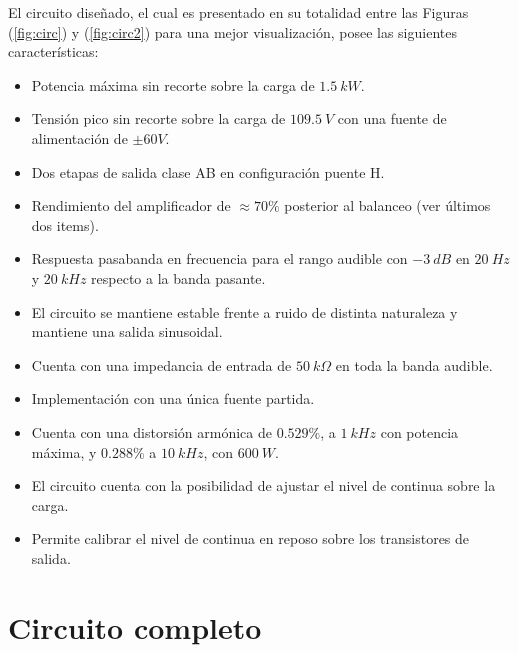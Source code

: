 
El circuito diseñado, el cual es presentado en su totalidad entre las Figuras (\ref{fig:circ}) y (\ref{fig:circ2}) para una mejor visualización, posee las siguientes características:
\begin{itemize}
\item Potencia máxima sin recorte sobre la carga de $1.5 \ kW$.
\item Tensión pico sin recorte sobre la carga de $109.5 \ V$ con una fuente de alimentación de $\pm 60V$.
\item Dos etapas de salida clase AB en configuración puente H.
\item Rendimiento del amplificador de $\approx 70\%$ posterior al balanceo (ver últimos dos items).
\item Respuesta pasabanda en frecuencia para el rango audible con $-3 \ dB$ en  $20 \ Hz$ y  $20 \ kHz$ respecto a la banda pasante.
\item El circuito se mantiene estable frente a ruido de distinta naturaleza y mantiene una salida sinusoidal.
\item Cuenta con una impedancia de entrada de $50 \ k\Omega$ en toda la banda audible.
\item Implementación con una única fuente partida.
\item Cuenta con una distorsión armónica de $0.529 \%$, a $1 \ kHz$ con potencia máxima, y $0.288\%$ a $10 \ kHz$, con $600 \ W$.
\item El circuito cuenta con la posibilidad de ajustar el nivel de continua sobre la carga.
\item Permite calibrar el nivel de continua en reposo sobre los transistores de salida.
\end{itemize}

\newpage

\section{Circuito completo}

